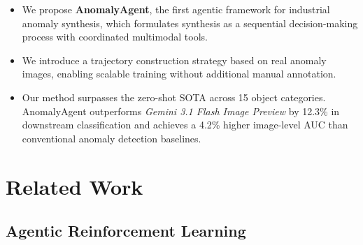 \documentclass[sigconf]{acmart}
\begin{document}
\begin{itemize}
    \item We propose \textbf{AnomalyAgent}, the first agentic framework for industrial anomaly synthesis, which formulates synthesis as a sequential decision-making process with coordinated multimodal tools.

    \item We introduce a trajectory construction strategy based on real anomaly images, enabling scalable training without additional manual annotation.

    \item Our method surpasses the zero-shot SOTA across 15 object categories. AnomalyAgent outperforms \emph{Gemini 3.1 Flash Image Preview} by 12.3\% in downstream classification and achieves a 4.2\% higher image-level AUC than conventional anomaly detection baselines.
\end{itemize}

\raggedbottom
\section{Related Work}

\subsection{Agentic Reinforcement Learning}
\end{document}
